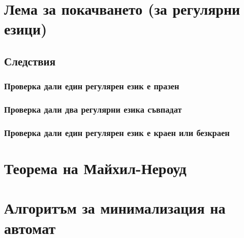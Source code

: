 \documentclass[a4paper, 12pt, oneside]{article}
\begin{document}
\section{Лема за покачването (за регулярни езици)}

\subsection{Следствия}

\subsubsection{Проверка дали един регулярен език е празен}

\subsubsection{Проверка дали два регулярни езика съвпадат}

\subsubsection{Проверка дали един регулярен език е краен или безкраен}

\section{Теорема на Майхил-Нероуд}

\section{Алгоритъм за минимализация на автомат}
\end{document}
